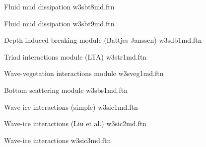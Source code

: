 \noindent
Fluid mud dissipation \citep{art:DL78}  \hfill {\file w3sbt8md.ftn}

\begin{flisti}
\end{flisti}

\pb \noindent
Fluid mud dissipation \citep{art:Ng00}  \hfill {\file w3sbt9md.ftn}

\begin{flisti}
\end{flisti}

\noindent
Depth induced breaking module (Battjes-Janssen) \hfill {\file w3sdb1md.ftn}

\begin{flisti}
\end{flisti}

\noindent
Triad interactions module (LTA) \hfill {\file w3str1md.ftn}

\begin{flisti}
\end{flisti}

\noindent
Wave-vegetation interactions module \hfill {\file w3sveg1md.ftn}

\begin{flisti}
\end{flisti}

\noindent
Bottom scattering module \hfill {\file w3sbs1md.ftn}

\begin{flisti}
\end{flisti}

\pb \noindent
Wave-ice interactions (simple) \hfill {\file w3sic1md.ftn}

\begin{flisti}
\end{flisti}

\noindent
Wave-ice interactions (Liu et al.) \hfill {\file w3sic2md.ftn}

\begin{flisti}
\end{flisti}

\noindent
Wave-ice interactions \cite{art:WS10} \hfill {\file w3sic3md.ftn}


